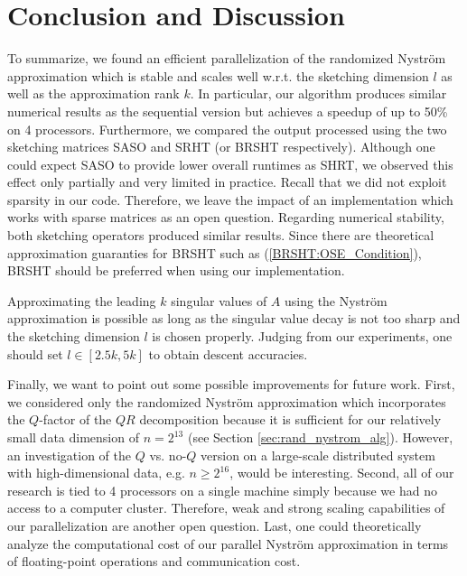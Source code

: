 \documentclass{article}
\theoremstyle{definition}
\begin{document}
\section{Conclusion and Discussion}
To summarize, we found an efficient parallelization of the randomized Nyström approximation which is stable and scales well w.r.t. the sketching dimension $l$ as well as the approximation rank $k$. In particular, our algorithm produces similar numerical results as the sequential version but achieves a speedup of up to 50\% on 4 processors. Furthermore, we compared the output processed using the two sketching matrices SASO and SRHT (or BRSHT respectively). Although one could expect SASO to provide lower overall runtimes as SHRT, we observed this effect only partially and very limited in practice. Recall that we did not exploit sparsity in our code. Therefore, we leave the impact of an implementation which works with sparse matrices as an open question. Regarding numerical stability, both sketching operators produced similar results. Since there are theoretical approximation guaranties for BRSHT such as (\ref{BRSHT:OSE_Condition}), BRSHT should be preferred when using our implementation.

Approximating the leading $k$ singular values of $A$ using the Nyström approximation is possible as long as the singular value decay is not too sharp and the sketching dimension $l$ is chosen properly. Judging from our experiments, one should set $l \in [2.5k, 5k]$ to obtain descent accuracies.

Finally, we want to point out some possible improvements for future work. First, we considered only the randomized Nyström approximation which incorporates the $Q$-factor of the $QR$ decomposition because it is sufficient for our relatively small data dimension of $n = 2^{13}$ (see Section \ref{sec:rand_nystrom_alg}). However, an investigation of the $Q$ vs. no-$Q$ version on a large-scale distributed system with high-dimensional data, e.g. $n \geq 2^{16}$, would be interesting. Second, all of our research is tied to 4 processors on a single machine simply because we had no access to a computer cluster. Therefore, weak and strong scaling capabilities of our parallelization are another open question. Last, one could theoretically analyze the computational cost of our parallel Nyström approximation in terms of floating-point operations and communication cost.
\end{document}
